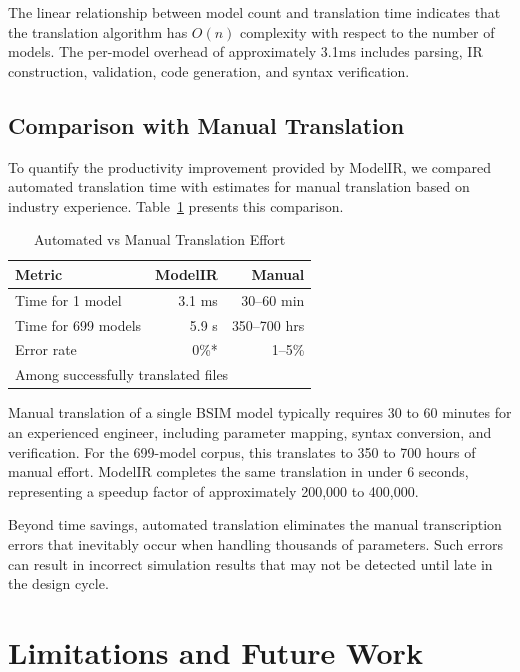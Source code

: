 \documentclass[conference]{IEEEtran}
\begin{document}
The linear relationship between model count and translation time indicates that the translation algorithm has $O(n)$ complexity with respect to the number of models. The per-model overhead of approximately 3.1ms includes parsing, IR construction, validation, code generation, and syntax verification.

\subsection{Comparison with Manual Translation}

To quantify the productivity improvement provided by ModelIR, we compared automated translation time with estimates for manual translation based on industry experience. Table~\ref{tab:comparison} presents this comparison.

\begin{table}[htbp]
\caption{Automated vs Manual Translation Effort}
\label{tab:comparison}
\centering
\begin{tabular}{lrr}
\toprule
\textbf{Metric} & \textbf{ModelIR} & \textbf{Manual} \\
\midrule
Time for 1 model & 3.1 ms & 30--60 min \\
Time for 699 models & 5.9 s & 350--700 hrs \\
Error rate & 0\%* & 1--5\% \\
\midrule
\multicolumn{3}{l}{\footnotesize *Among successfully translated files} \\
\bottomrule
\end{tabular}
\end{table}

Manual translation of a single BSIM model typically requires 30 to 60 minutes for an experienced engineer, including parameter mapping, syntax conversion, and verification. For the 699-model corpus, this translates to 350 to 700 hours of manual effort. ModelIR completes the same translation in under 6 seconds, representing a speedup factor of approximately 200,000 to 400,000.

Beyond time savings, automated translation eliminates the manual transcription errors that inevitably occur when handling thousands of parameters. Such errors can result in incorrect simulation results that may not be detected until late in the design cycle.

\section{Limitations and Future Work}
\end{document}
